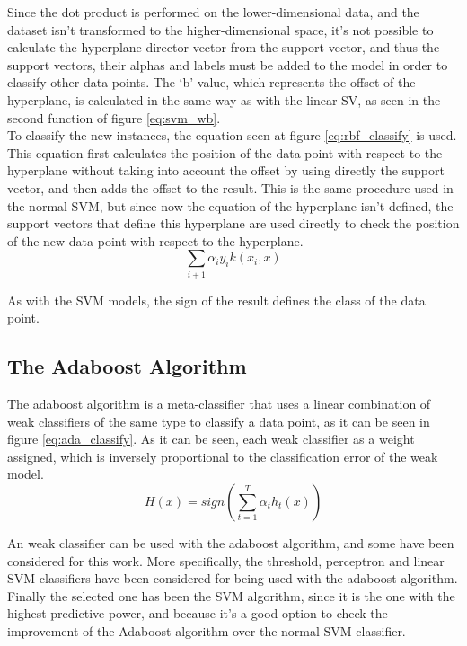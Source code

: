 \documentclass[10pt, journal]{IEEEtran}
\begin{document}
Since the dot product is performed on the lower-dimensional data, and the dataset isn't transformed to the higher-dimensional space, it's not possible to calculate the hyperplane director vector from the support vector, and thus the support vectors, their alphas and labels must be added to the model in order to classify other data points. The `b' value, which represents the offset of the hyperplane, is calculated in the same way as with the linear SV, as seen in the second function of figure \ref{eq:svm_wb}.\\

To classify the new instances, the equation seen at figure \ref{eq:rbf_classify} is used. This equation first calculates the position of the data point with respect to the hyperplane without taking into account the offset by using directly the support vector, and then adds the offset to the result. This is the same procedure used in the normal SVM, but since now the equation of the hyperplane isn’t defined, the support vectors that define this hyperplane are used directly to check the position of the new data point with respect to the hyperplane.\\

\begin{equation}
	\sum_{i+1}{\alpha_{i}y_i k(x_i,x)}
	\label{eq:rbf_classify}
\end{equation}

As with the SVM models, the sign of the result defines the class of the data point.

\subsection{The Adaboost Algorithm} %
\label{sub:the_adaboost_algorithm}
The adaboost algorithm is a meta-classifier that uses a linear combination of weak classifiers of the same type to classify a data point, as it can be seen in figure \ref{eq:ada_classify}. As it can be seen, each weak classifier as a weight assigned, which is inversely proportional to the classification error of the weak model.\\
\begin{equation}
	H(x) = sign(\sum_{t=1}^{T}{\alpha_t h_t(x)})
	\label{eq:ada_classify}
\end{equation}

An weak classifier can be used with the adaboost algorithm, and some have been considered for this work. More specifically, the threshold, perceptron and linear SVM classifiers have been considered for being used with the adaboost algorithm. Finally the selected one has been the SVM algorithm, since it is the one with the highest predictive power, and because it’s a good option to check the improvement of the Adaboost algorithm over the normal SVM classifier.\\
\end{document}
